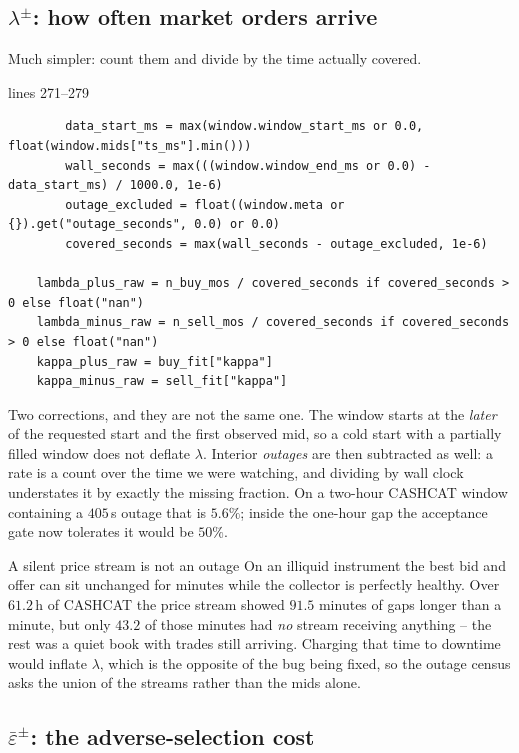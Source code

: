 \documentclass[11pt,a4paper]{article}
\newcommand{\epsb}{\bar{\varepsilon}}
\newcommand{\snip}[3]{%
  \par\addvspace{6pt}\noindent
  {\footnotesize\color{NavyLink}\texttt{\detokenize{#1}}\quad lines #2--#3}%
  \par\nobreak\vspace{1pt}}
\begin{document}
\subsection{\texorpdfstring{$\lambda^{\pm}$}{lambda}: how often market orders arrive}

Much simpler: count them and divide by the time actually covered.

\snip{scripts/get_kappa.py}{271}{279}
\begin{lstlisting}
        data_start_ms = max(window.window_start_ms or 0.0, float(window.mids["ts_ms"].min()))
        wall_seconds = max(((window.window_end_ms or 0.0) - data_start_ms) / 1000.0, 1e-6)
        outage_excluded = float((window.meta or {}).get("outage_seconds", 0.0) or 0.0)
        covered_seconds = max(wall_seconds - outage_excluded, 1e-6)

    lambda_plus_raw = n_buy_mos / covered_seconds if covered_seconds > 0 else float("nan")
    lambda_minus_raw = n_sell_mos / covered_seconds if covered_seconds > 0 else float("nan")
    kappa_plus_raw = buy_fit["kappa"]
    kappa_minus_raw = sell_fit["kappa"]
\end{lstlisting}

Two corrections, and they are not the same one. The window starts at the
\emph{later} of the requested start and the first observed mid, so a cold start
with a partially filled window does not deflate $\lambda$. Interior
\emph{outages} are then subtracted as well: a rate is a count over the time we
were watching, and dividing by wall clock understates it by exactly the missing
fraction. On a two-hour CASHCAT window containing a $405$\,s outage that is
$5.6\%$; inside the one-hour gap the acceptance gate now tolerates it would be
$50\%$.

\begin{trap}{A silent price stream is not an outage}
On an illiquid instrument the best bid and offer can sit unchanged for minutes
while the collector is perfectly healthy. Over $61.2$\,h of CASHCAT the price
stream showed $91.5$ minutes of gaps longer than a minute, but only $43.2$ of
those minutes had \emph{no} stream receiving anything -- the rest was a quiet
book with trades still arriving. Charging that time to downtime would inflate
$\lambda$, which is the opposite of the bug being fixed, so the outage census
asks the union of the streams rather than the mids alone.
\end{trap}

\subsection{\texorpdfstring{$\epsb^{\pm}$}{epsilon-bar}: the adverse-selection cost}
\end{document}
